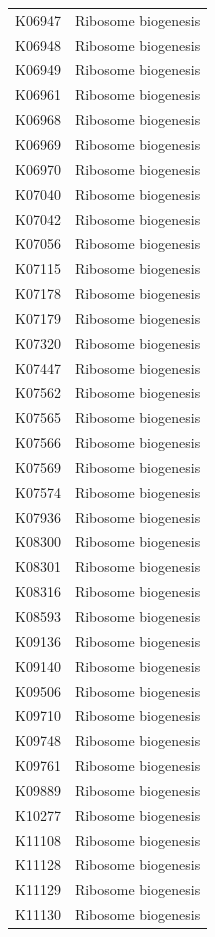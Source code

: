 \begin{longtable}{@{}l l@{}}
K06947 & Ribosome biogenesis \\
K06948 & Ribosome biogenesis \\
K06949 & Ribosome biogenesis \\
K06961 & Ribosome biogenesis \\
K06968 & Ribosome biogenesis \\
K06969 & Ribosome biogenesis \\
K06970 & Ribosome biogenesis \\
K07040 & Ribosome biogenesis \\
K07042 & Ribosome biogenesis \\
K07056 & Ribosome biogenesis \\
K07115 & Ribosome biogenesis \\
K07178 & Ribosome biogenesis \\
K07179 & Ribosome biogenesis \\
K07320 & Ribosome biogenesis \\
K07447 & Ribosome biogenesis \\
K07562 & Ribosome biogenesis \\
K07565 & Ribosome biogenesis \\
K07566 & Ribosome biogenesis \\
K07569 & Ribosome biogenesis \\
K07574 & Ribosome biogenesis \\
K07936 & Ribosome biogenesis \\
K08300 & Ribosome biogenesis \\
K08301 & Ribosome biogenesis \\
K08316 & Ribosome biogenesis \\
K08593 & Ribosome biogenesis \\
K09136 & Ribosome biogenesis \\
K09140 & Ribosome biogenesis \\
K09506 & Ribosome biogenesis \\
K09710 & Ribosome biogenesis \\
K09748 & Ribosome biogenesis \\
K09761 & Ribosome biogenesis \\
K09889 & Ribosome biogenesis \\
K10277 & Ribosome biogenesis \\
K11108 & Ribosome biogenesis \\
K11128 & Ribosome biogenesis \\
K11129 & Ribosome biogenesis \\
K11130 & Ribosome biogenesis \\

\end{longtable}

